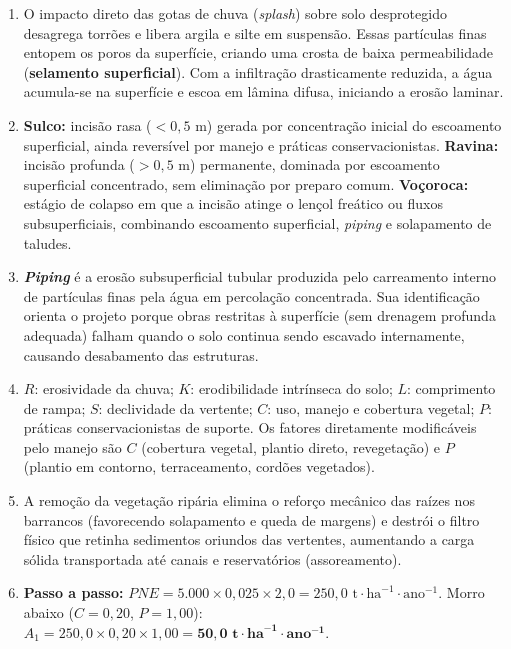 \begin{boxGabarito}
\begin{enumerate}[leftmargin=1.6em, itemsep=4pt]
  \item O impacto direto das gotas de chuva (\textit{splash}) sobre solo desprotegido desagrega torrões e libera argila e silte em suspensão. Essas partículas finas entopem os poros da superfície, criando uma crosta de baixa permeabilidade (\textbf{selamento superficial}). Com a infiltração drasticamente reduzida, a água acumula-se na superfície e escoa em lâmina difusa, iniciando a erosão laminar.
  \item \textbf{Sulco:} incisão rasa ($<0{,}5\text{ m}$) gerada por concentração inicial do escoamento superficial, ainda reversível por manejo e práticas conservacionistas. \textbf{Ravina:} incisão profunda ($>0{,}5\text{ m}$) permanente, dominada por escoamento superficial concentrado, sem eliminação por preparo comum. \textbf{Voçoroca:} estágio de colapso em que a incisão atinge o lençol freático ou fluxos subsuperficiais, combinando escoamento superficial, \textit{piping} e solapamento de taludes.
  \item \textbf{\textit{Piping}} é a erosão subsuperficial tubular produzida pelo carreamento interno de partículas finas pela água em percolação concentrada. Sua identificação orienta o projeto porque obras restritas à superfície (sem drenagem profunda adequada) falham quando o solo continua sendo escavado internamente, causando desabamento das estruturas.
  \item $R$: erosividade da chuva; $K$: erodibilidade intrínseca do solo; $L$: comprimento de rampa; $S$: declividade da vertente; $C$: uso, manejo e cobertura vegetal; $P$: práticas conservacionistas de suporte. Os fatores diretamente modificáveis pelo manejo são \textbf{$C$} (cobertura vegetal, plantio direto, revegetação) e \textbf{$P$} (plantio em contorno, terraceamento, cordões vegetados).
  \item A remoção da vegetação ripária elimina o reforço mecânico das raízes nos barrancos (favorecendo solapamento e queda de margens) e destrói o filtro físico que retinha sedimentos oriundos das vertentes, aumentando a carga sólida transportada até canais e reservatórios (assoreamento).
  \item \textbf{Passo a passo:}
  $PNE = 5.000 \times 0{,}025 \times 2{,}0 = 250{,}0\text{ t}\cdot\text{ha}^{-1}\cdot\text{ano}^{-1}$.
  Morro abaixo ($C = 0{,}20$, $P = 1{,}00$): $A_1 = 250{,}0 \times 0{,}20 \times 1{,}00 = \mathbf{50{,}0\text{ t}\cdot\text{ha}^{-1}\cdot\text{ano}^{-1}}$.

\end{enumerate}
\end{boxGabarito}
